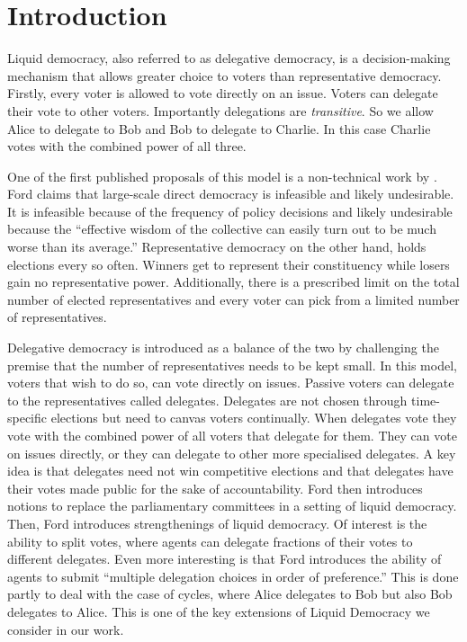 \documentclass[11pt,a4paper, titlepage]{article}
\theoremstyle{definition}
\begin{document}
\newpage

\tableofcontents

\newpage

\section{Introduction}

Liquid democracy, also referred to as delegative democracy, is a decision-making mechanism that allows greater choice to voters than representative democracy.
Firstly, every voter is allowed to vote directly on an issue. 
Voters can delegate their vote to other voters.
Importantly delegations are \emph{transitive}. 
So we allow Alice to delegate to Bob and Bob to delegate to Charlie. In this case Charlie votes with the combined power of all three.

One of the first published proposals of this model is a non-technical work by \cite{ford2002delegative}. 
Ford claims that large-scale direct democracy is infeasible and likely undesirable.
It is infeasible because of the frequency of policy decisions and likely undesirable because the ``effective wisdom of the collective can easily turn out to be much worse than its average.''
Representative democracy on the other hand, holds elections every so often. Winners get to represent their constituency while losers gain no representative power.
Additionally, there is a prescribed limit on the total number of elected representatives and every voter can pick from a limited number of representatives.

Delegative democracy is introduced as a balance of the two by challenging the premise that the number of representatives needs to be kept small.
In this model, voters that wish to do so, can vote directly on issues.
Passive voters can delegate to the representatives called delegates.
Delegates are not chosen through time-specific elections but need to canvas voters continually.
When delegates vote they vote with the combined power of all voters that delegate for them.
They can vote on issues directly, or they can delegate to other more specialised delegates.
A key idea is that delegates need not win competitive elections and that delegates have their votes made public for the sake of accountability. 
Ford then introduces notions to replace the parliamentary committees in a setting of liquid democracy.
Then, Ford introduces strengthenings of liquid democracy.
Of interest is the ability to split votes, where agents can delegate fractions of their votes to different delegates. 
Even more interesting is that Ford introduces the ability of agents to submit ``multiple delegation choices in order of preference.'' This is done partly to deal with the case of cycles, where Alice delegates to Bob but also Bob delegates to Alice.
This is one of the key extensions of Liquid Democracy we consider in our work.
\end{document}
